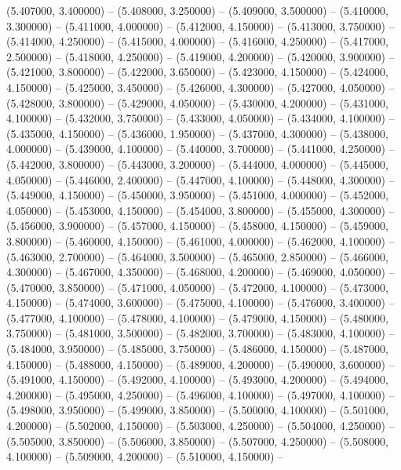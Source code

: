 (5.407000, 3.400000) -- 
(5.408000, 3.250000) -- 
(5.409000, 3.500000) -- 
(5.410000, 3.300000) -- 
(5.411000, 4.000000) -- 
(5.412000, 4.150000) -- 
(5.413000, 3.750000) -- 
(5.414000, 4.250000) -- 
(5.415000, 4.000000) -- 
(5.416000, 4.250000) -- 
(5.417000, 2.500000) -- 
(5.418000, 4.250000) -- 
(5.419000, 4.200000) -- 
(5.420000, 3.900000) -- 
(5.421000, 3.800000) -- 
(5.422000, 3.650000) -- 
(5.423000, 4.150000) -- 
(5.424000, 4.150000) -- 
(5.425000, 3.450000) -- 
(5.426000, 4.300000) -- 
(5.427000, 4.050000) -- 
(5.428000, 3.800000) -- 
(5.429000, 4.050000) -- 
(5.430000, 4.200000) -- 
(5.431000, 4.100000) -- 
(5.432000, 3.750000) -- 
(5.433000, 4.050000) -- 
(5.434000, 4.100000) -- 
(5.435000, 4.150000) -- 
(5.436000, 1.950000) -- 
(5.437000, 4.300000) -- 
(5.438000, 4.000000) -- 
(5.439000, 4.100000) -- 
(5.440000, 3.700000) -- 
(5.441000, 4.250000) -- 
(5.442000, 3.800000) -- 
(5.443000, 3.200000) -- 
(5.444000, 4.000000) -- 
(5.445000, 4.050000) -- 
(5.446000, 2.400000) -- 
(5.447000, 4.100000) -- 
(5.448000, 4.300000) -- 
(5.449000, 4.150000) -- 
(5.450000, 3.950000) -- 
(5.451000, 4.000000) -- 
(5.452000, 4.050000) -- 
(5.453000, 4.150000) -- 
(5.454000, 3.800000) -- 
(5.455000, 4.300000) -- 
(5.456000, 3.900000) -- 
(5.457000, 4.150000) -- 
(5.458000, 4.150000) -- 
(5.459000, 3.800000) -- 
(5.460000, 4.150000) -- 
(5.461000, 4.000000) -- 
(5.462000, 4.100000) -- 
(5.463000, 2.700000) -- 
(5.464000, 3.500000) -- 
(5.465000, 2.850000) -- 
(5.466000, 4.300000) -- 
(5.467000, 4.350000) -- 
(5.468000, 4.200000) -- 
(5.469000, 4.050000) -- 
(5.470000, 3.850000) -- 
(5.471000, 4.050000) -- 
(5.472000, 4.100000) -- 
(5.473000, 4.150000) -- 
(5.474000, 3.600000) -- 
(5.475000, 4.100000) -- 
(5.476000, 3.400000) -- 
(5.477000, 4.100000) -- 
(5.478000, 4.100000) -- 
(5.479000, 4.150000) -- 
(5.480000, 3.750000) -- 
(5.481000, 3.500000) -- 
(5.482000, 3.700000) -- 
(5.483000, 4.100000) -- 
(5.484000, 3.950000) -- 
(5.485000, 3.750000) -- 
(5.486000, 4.150000) -- 
(5.487000, 4.150000) -- 
(5.488000, 4.150000) -- 
(5.489000, 4.200000) -- 
(5.490000, 3.600000) -- 
(5.491000, 4.150000) -- 
(5.492000, 4.100000) -- 
(5.493000, 4.200000) -- 
(5.494000, 4.200000) -- 
(5.495000, 4.250000) -- 
(5.496000, 4.100000) -- 
(5.497000, 4.100000) -- 
(5.498000, 3.950000) -- 
(5.499000, 3.850000) -- 
(5.500000, 4.100000) -- 
(5.501000, 4.200000) -- 
(5.502000, 4.150000) -- 
(5.503000, 4.250000) -- 
(5.504000, 4.250000) -- 
(5.505000, 3.850000) -- 
(5.506000, 3.850000) -- 
(5.507000, 4.250000) -- 
(5.508000, 4.100000) -- 
(5.509000, 4.200000) -- 
(5.510000, 4.150000) -- 

